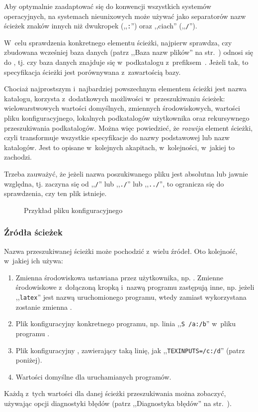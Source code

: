 \documentclass{article}
\renewcommand{\samp}[1]{,,\texttt{#1}''}  %
\begin{document}
Aby optymalnie zaadaptować się  do konwencji wszystkich systemów operacyjnych,
na systemach nieunixowych \KPS{} może używać
jako separatorów nazw ścieżek znaków innych
niż dwukropek (\samp{:}) oraz ,,ciach'' (\samp{/}).

W~celu sprawdzenia konkretnego elementu  ścieżki, \KPS{} najpierw
sprawdza, czy zbudowana wcześniej baza danych (patrz ,,Baza nazw plików'' na
str.~\pageref{sec:filename-database}) odnosi się  do , tj.
czy baza danych znajduje się  w~podkatalogu z~prefiksem~.
Jeżeli tak, to specyfikacja ścieżki jest porównywana z~zawartością bazy.

Chociaż najprostszym i~najbardziej powszechnym elementem ścieżki jest
nazwa katalogu, \KPS{} korzysta z~dodatkowych możliwości w~przeszukiwaniu
ścieżek:
wielowarstwowych wartości domyślnych, zmiennych środowiskowych, wartości
pliku konfiguracyjnego, lokalnych
podkatalogów użytkownika oraz rekursywnego przeszukiwania podkatalogów.
Można więc powiedzieć, że \KPS{} \emph{rozwija} element ścieżki, czyli
transformuje wszystkie specyfikacje do nazwy podstawowej lub nazw katalogów.
Jest to opisane w~kolejnych akapitach, w~kolejności, w~jakiej to zachodzi.

Trzeba zauważyć, że jeżeli nazwa poszukiwanego pliku jest
absolutna lub jawnie względna, tj. zaczyna się  od \samp{/} lub \samp{./}
lub \samp{../}, to \KPS{} ogranicza się  do sprawdzenia, czy ten plik istnieje.

\ifSingleColumn
\else
\begin{figure*}

\setlength{\abovecaptionskip}{0pt}
  \caption{Przykład pliku konfiguracyjnego}
  \label{fig:config-sample}
\end{figure*}
\fi
\subsubsection{Źródła ścieżek}
\label{sec:path-sources}

Nazwa przeszukiwanej ścieżki może pochodzić z~wielu źródeł.
Oto kolejność, w~jakiej \KPS{} ich używa:

\begin{enumerate}
\item
  Zmienna środowiskowa ustawiana przez użytkownika, np.
  \@.
  Zmienne środowiskowe z~dołączoną kropką i~nazwą programu zastępują inne,
  np. jeżeli \samp{latex} jest nazwą uruchomionego programu, wtedy zamiast
   wykorzystana zostanie zmienna .
\item
  Plik konfiguracyjny konkretnego programu, np. linia ,,\texttt{S /a:/b}''
  w~pliku  programu .
\item   Plik konfiguracyjny \KPS{} , zawierający taką linię,
  jak \samp{TEXINPUTS=/c:/d} (patrz poniżej).
\item Wartości domyślne dla uruchamianych programów.
\end{enumerate}
\noindent Każdą z~tych wartości dla danej ścieżki przeszukiwania można
zobaczyć, używając opcji diagnostyki błędów (patrz ,,Diagnostyka błędów'' na
str.~\pageref{sec:debugging}).
\end{document}
